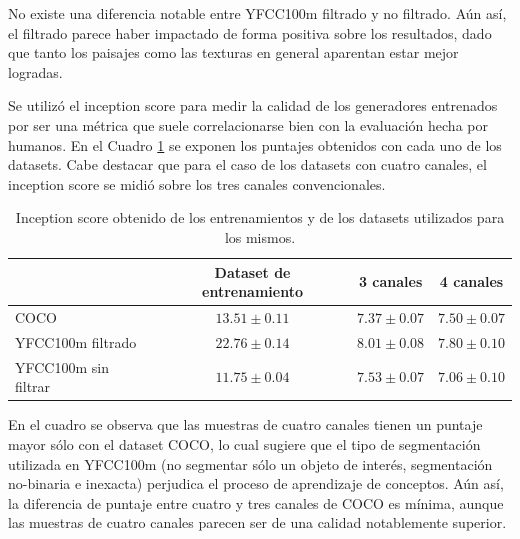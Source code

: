 \documentclass[spanish]{report}
\begin{document}
No existe una diferencia notable entre YFCC100m filtrado y no filtrado. Aún así, el filtrado parece haber impactado de forma positiva sobre los resultados, dado que tanto los paisajes como las texturas en general aparentan estar mejor logradas.

Se utilizó el inception score para medir la calidad de los generadores entrenados por ser una métrica que suele correlacionarse bien con la evaluación hecha por humanos. En el Cuadro \ref{tab:inception_scores} se exponen los puntajes obtenidos con cada uno de los datasets. Cabe destacar que para el caso de los datasets con cuatro canales, el inception score se midió sobre los tres canales convencionales.

\begin{table}[H]
\centering

\begin{tabular}{ l | c | c | c }

  ~ & \textbf{Dataset de entrenamiento} & \textbf{3 canales} & \textbf{4 canales}\\
  \hline  
  COCO & $13.51 \pm 0.11$  & $7.37 \pm 0.07$ & $7.50 \pm 0.07$ \\
  YFCC100m filtrado & $22.76 \pm 0.14$ & $8.01 \pm 0.08$ & $7.80 \pm 0.10$ \\
  YFCC100m sin filtrar & $11.75 \pm 0.04$ & $7.53 \pm 0.07$ & $7.06 \pm 0.10 $ \\
  
  

\end{tabular}

\caption{Inception score obtenido de los entrenamientos y de los datasets utilizados para los mismos.}\label{tab:inception_scores}
\end{table}

En el cuadro se observa que las muestras de cuatro canales tienen un puntaje mayor sólo con el dataset COCO, lo cual sugiere que el tipo de segmentación utilizada en YFCC100m (no segmentar sólo un objeto de interés, segmentación no-binaria e inexacta) perjudica el proceso de aprendizaje de conceptos. Aún así, la diferencia de puntaje entre cuatro y tres canales de COCO es mínima, aunque las muestras de cuatro canales parecen ser de una calidad notablemente superior. 
\end{document}
